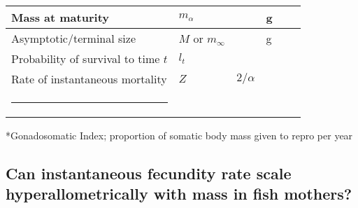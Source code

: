 \documentclass[a4paper]{article} %
\makeatletter
\newcommand{\thickhline}{%
    \noalign {\ifnum 0=`}\fi \hrule height 1pt
    \futurelet \reserved@a \@xhline
}
\makeatother
\begin{document}
\begin{table}[h]
\begin{tabularx}{\linewidth}{Xlllll}
    Mass at maturity                                        & $m_{\alpha}$          &                           & g                     &                                   &                       \\ \hline
    Asymptotic/terminal size                                & $M$ or $m_{\infty}$   &                           & g                     &                                   &                       \\ \hline
    Probability of survival to time $t$                     & $l_t$                 &                           & \textsc{}             &                                   &                       \\ \hline
    Rate of instantaneous mortality                         & $Z$                   & $2/\alpha$                &                       &                                   &                       \\ \thickhline
    \end{tabularx}
\end{table}
*Gonadosomatic Index; proportion of somatic body mass given to repro per year

\subsection{Can instantaneous fecundity rate scale hyperallometrically with mass in fish mothers?}
\end{document}
